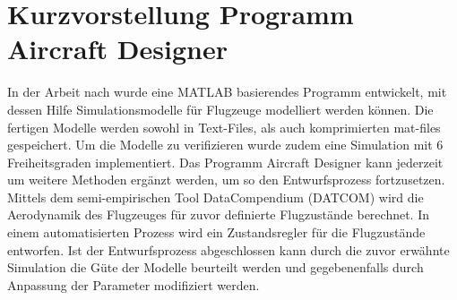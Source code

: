  \section{Kurzvorstellung Programm Aircraft Designer}
 In der Arbeit nach  \cite{Olucak.15.02.2017} wurde eine MATLAB basierendes Programm entwickelt, mit dessen Hilfe Simulationsmodelle für Flugzeuge modelliert werden können. Die fertigen Modelle werden sowohl in Text-Files, als auch komprimierten mat-files gespeichert. Um die Modelle zu verifizieren wurde zudem eine Simulation mit 6 Freiheitsgraden implementiert. Das Programm Aircraft Designer kann jederzeit um weitere Methoden ergänzt werden, um so den Entwurfsprozess fortzusetzen. Mittels dem semi-empirischen Tool DataCompendium (DATCOM) wird die Aerodynamik des Flugzeuges für zuvor definierte Flugzustände berechnet. In einem automatisierten Prozess wird ein Zustandsregler für die Flugzustände entworfen. Ist der Entwurfsprozess abgeschlossen kann durch die zuvor erwähnte Simulation die Güte der Modelle beurteilt werden und gegebenenfalls durch Anpassung der Parameter modifiziert werden.  
